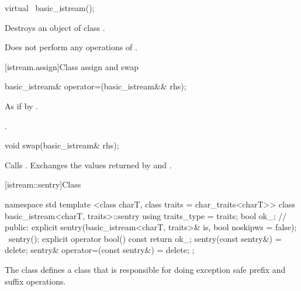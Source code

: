 %
\begin{itemdecl}
virtual ~basic_istream();
\end{itemdecl}

\begin{itemdescr}
\pnum
\effects
Destroys an object of class
.

\pnum
\remarks
Does not perform any operations of
.
\end{itemdescr}

[istream.assign]{Class  assign and swap}

%
\begin{itemdecl}
basic_istream& operator=(basic_istream&& rhs);
\end{itemdecl}

\begin{itemdescr}
\pnum
\effects As if by .

\pnum
\returns {}.
\end{itemdescr}

%
\begin{itemdecl}
void swap(basic_istream& rhs);
\end{itemdecl}

\begin{itemdescr}
\pnum
\effects Calls .
Exchanges the values returned by  and
.
\end{itemdescr}

[istream::sentry]{Class }

%
%
\begin{codeblock}
namespace std {
  template <class charT, class traits = char_traits<charT>>
  class basic_istream<charT, traits>::sentry {
    using traits_type = traits;
    bool ok_; // \expos
  public:
    explicit sentry(basic_istream<charT, traits>& is, bool noskipws = false);
    ~sentry();
    explicit operator bool() const { return ok_; }
    sentry(const sentry&) = delete;
    sentry& operator=(const sentry&) = delete;
  };
}
\end{codeblock}

\begin{itemdescr}
\pnum
The class
defines a class that is responsible for doing exception safe prefix and suffix
operations.
\end{itemdescr}

